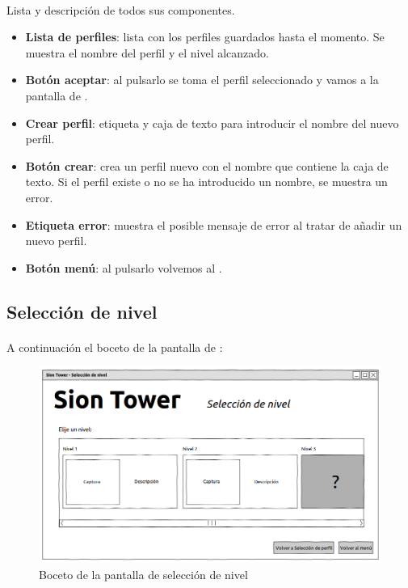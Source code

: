 \paragraph{}
Lista y descripción de todos sus componentes.

\begin{itemize}
    \item \textbf{Lista de perfiles}: lista con los perfiles guardados
    hasta el momento. Se muestra el nombre del perfil y el nivel alcanzado.
    \item \textbf{Botón aceptar}: al pulsarlo se toma el perfil seleccionado
    y vamos a la pantalla de \selnivel.
    \item \textbf{Crear perfil}: etiqueta y caja de texto para introducir
    el nombre del nuevo perfil.
    \item \textbf{Botón crear}: crea un perfil nuevo con el nombre que contiene
    la caja de texto. Si el perfil existe o no se ha introducido un nombre,
    se muestra un error.
    \item \textbf{Etiqueta error}: muestra el posible mensaje de error
    al tratar de añadir un nuevo perfil.
    \item \textbf{Botón menú}: al pulsarlo volvemos al \menu.
\end{itemize}

\clearpage

\subsection{Selección de nivel}
\label{sec:ui-selnivel}

\paragraph{}
A continuación el boceto de la pantalla de \selnivel:

\begin{figure}[H]
    \centering
        \includegraphics[width=\textwidth]{img/sel-nivel.png} 
    \caption{Boceto de la pantalla de selección de nivel}
    \label{img:sel-nivel}
\end{figure}


